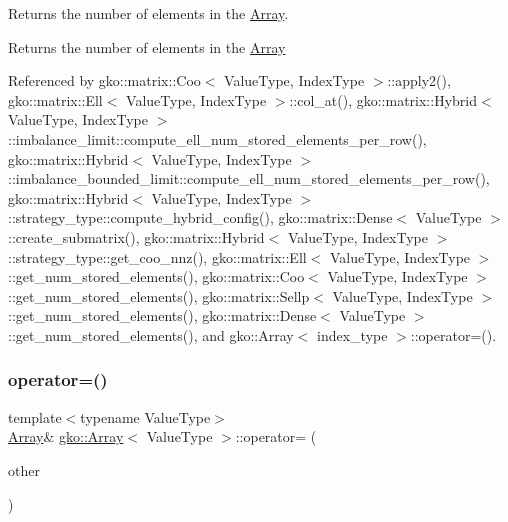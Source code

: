 Returns the number of elements in the \hyperlink{classgko_1_1Array}{Array}. 

\begin{DoxyReturn}{Returns}
the number of elements in the \hyperlink{classgko_1_1Array}{Array} 
\end{DoxyReturn}


Referenced by gko\+::matrix\+::\+Coo$<$ Value\+Type, Index\+Type $>$\+::apply2(), gko\+::matrix\+::\+Ell$<$ Value\+Type, Index\+Type $>$\+::col\+\_\+at(), gko\+::matrix\+::\+Hybrid$<$ Value\+Type, Index\+Type $>$\+::imbalance\+\_\+limit\+::compute\+\_\+ell\+\_\+num\+\_\+stored\+\_\+elements\+\_\+per\+\_\+row(), gko\+::matrix\+::\+Hybrid$<$ Value\+Type, Index\+Type $>$\+::imbalance\+\_\+bounded\+\_\+limit\+::compute\+\_\+ell\+\_\+num\+\_\+stored\+\_\+elements\+\_\+per\+\_\+row(), gko\+::matrix\+::\+Hybrid$<$ Value\+Type, Index\+Type $>$\+::strategy\+\_\+type\+::compute\+\_\+hybrid\+\_\+config(), gko\+::matrix\+::\+Dense$<$ Value\+Type $>$\+::create\+\_\+submatrix(), gko\+::matrix\+::\+Hybrid$<$ Value\+Type, Index\+Type $>$\+::strategy\+\_\+type\+::get\+\_\+coo\+\_\+nnz(), gko\+::matrix\+::\+Ell$<$ Value\+Type, Index\+Type $>$\+::get\+\_\+num\+\_\+stored\+\_\+elements(), gko\+::matrix\+::\+Coo$<$ Value\+Type, Index\+Type $>$\+::get\+\_\+num\+\_\+stored\+\_\+elements(), gko\+::matrix\+::\+Sellp$<$ Value\+Type, Index\+Type $>$\+::get\+\_\+num\+\_\+stored\+\_\+elements(), gko\+::matrix\+::\+Dense$<$ Value\+Type $>$\+::get\+\_\+num\+\_\+stored\+\_\+elements(), and gko\+::\+Array$<$ index\+\_\+type $>$\+::operator=().

\mbox{\label{classgko_1_1Array_a841412d7a03b8210ba39e77b3bd05ce3}} 
\subsubsection{\texorpdfstring{operator=()}{operator=()}\hspace{0.1cm}{\footnotesize\ttfamily [1/2]}}
{\footnotesize\ttfamily template$<$typename Value\+Type$>$ \\
\hyperlink{classgko_1_1Array}{Array}\& \hyperlink{classgko_1_1Array}{gko\+::\+Array}$<$ Value\+Type $>$\+::operator= (\begin{DoxyParamCaption}\item[{const \hyperlink{classgko_1_1Array}{Array}$<$ Value\+Type $>$ \&}]{other }\end{DoxyParamCaption})}



